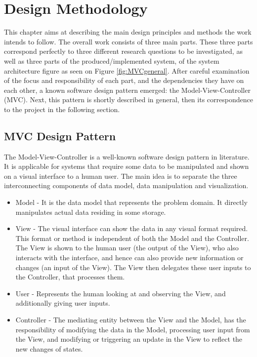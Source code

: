 \chapter{Design Methodology}

This chapter aims at describing the main design principles and methods the work intends to follow. The overall work consists of three main parts. These three parts correspond perfectly to three different research questions to be investigated, as well as three parts of the produced/implemented system, of the system architecture figure as seen on Figure \ref{fig:MVCgeneral}. After careful examination of the focus and responsibility of each part, and the dependencies they have on each other, a known software design pattern emerged: the Model-View-Controller (MVC). Next, this pattern is shortly described in general, then its correspondence to the project in the following section. 

\section{MVC Design Pattern}
The Model-View-Controller is a well-known software design pattern in literature. It is applicable for systems that require some data to be manipulated and shown on a visual interface to a human user. The main idea is to separate the three interconnecting components of data model, data manipulation and visualization.
\begin{itemize}
\item Model - It is the data model that represents the problem domain. It directly manipulates actual data residing in some storage. 
\item View - The visual interface can show the data in any visual format required. This format or method is independent of both the Model and the Controller. The View is shown to the human user (the output of the View), who also interacts with the interface, and hence can also provide new information or changes (an input of the View). The View then delegates these user inputs to the Controller, that processes them. 
\item User - Represents the human looking at and observing the View, and additionally giving user inputs.
\item Controller - The mediating entity between the View and the Model, has the responsibility of modifying the data in the Model, processing user input from the View, and modifying or triggering an update in the View to reflect the new changes of states.

\end{itemize}


  
  
  
  